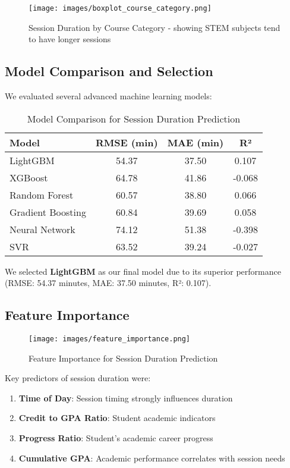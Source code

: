 \documentclass[12pt,letterpaper]{article}
\begin{document}
\begin{figure}[H]
    \centering
    \texttt{[image: images/boxplot\_course\_category.png]}
    \caption{Session Duration by Course Category - showing STEM subjects tend to have longer sessions}
\end{figure}

\subsection{Model Comparison and Selection}

We evaluated several advanced machine learning models:

\begin{table}[H]
\centering
\begin{tabular}{lccc}
\toprule
\textbf{Model} & \textbf{RMSE (min)} & \textbf{MAE (min)} & \textbf{R²} \\
\midrule
LightGBM & 54.37 & 37.50 & 0.107 \\
XGBoost & 64.78 & 41.86 & -0.068 \\
Random Forest & 60.57 & 38.80 & 0.066 \\
Gradient Boosting & 60.84 & 39.69 & 0.058 \\
Neural Network & 74.12 & 51.38 & -0.398 \\
SVR & 63.52 & 39.24 & -0.027 \\
\bottomrule
\end{tabular}
\caption{Model Comparison for Session Duration Prediction}
\end{table}

We selected \textbf{LightGBM} as our final model due to its superior performance (RMSE: 54.37 minutes, MAE: 37.50 minutes, R²: 0.107).

\subsection{Feature Importance}

\begin{figure}[H]
    \centering
    \texttt{[image: images/feature\_importance.png]}
    \caption{Feature Importance for Session Duration Prediction}
\end{figure}

Key predictors of session duration were:
\begin{enumerate}
    \item \textbf{Time of Day}: Session timing strongly influences duration
    \item \textbf{Credit to GPA Ratio}: Student academic indicators
    \item \textbf{Progress Ratio}: Student's academic career progress
    \item \textbf{Cumulative GPA}: Academic performance correlates with session needs
\end{enumerate}
\end{document}
